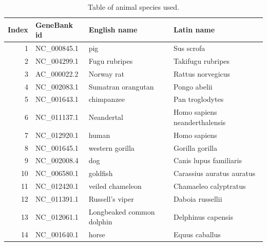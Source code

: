 \documentclass[a4paper,11pt]{article}
\begin{document}
\begin{table}[htbp]
\caption{Table of animal species used.}
\label{animalTable}
\begin{center}
\begin{tabular}{rllp{6cm}}
\hline
Index & GeneBank id & English name & Latin name\\
\hline
  1 &   NC\_000845.1 &                        pig &                     Sus scrofa \\
  2 &   NC\_004299.1 &              Fugu rubripes &              Takifugu rubripes \\ 
  3 &   AC\_000022.2 &                 Norway rat &              Rattus norvegicus \\
  4 &   NC\_002083.1 &         Sumatran orangutan &                   Pongo abelii \\
  5 &   NC\_001643.1 &                 chimpanzee &                Pan troglodytes \\
  6 &   NC\_011137.1 &                 Neandertal &  Homo sapiens neanderthalensis \\
  7 &   NC\_012920.1 &                      human &                   Homo sapiens \\
  8 &   NC\_001645.1 &            western gorilla &                Gorilla gorilla \\
  9 &   NC\_002008.4 &                        dog &         Canis lupus familiaris \\
 10 &   NC\_006580.1 &                   goldfish &      Carassius auratus auratus \\
 11 &   NC\_012420.1 &           veiled chameleon &          Chamaeleo calyptratus \\
 12 &   NC\_011391.1 &            Russell's viper &               Daboia russellii \\
 13 &   NC\_012061.1 &  Longbeaked common dolphin &             Delphinus capensis \\
 14 &   NC\_001640.1 &                      horse &                 Equus caballus 

\\
\hline
\end{tabular}
\end{center}
\end{table}
\end{document}
